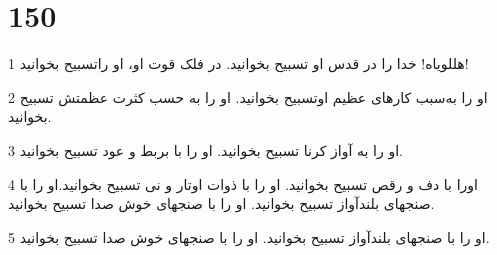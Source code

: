 \chapter{150}

\par 1 هللویاه! خدا را در قدس او تسبیح بخوانید. در فلک قوت او، او راتسبیح بخوانید!
\par 2 او را به‌سبب کارهای عظیم اوتسبیح بخوانید. او را به حسب کثرت عظمتش تسبیح بخوانید.
\par 3 او را به آواز کرنا تسبیح بخوانید. او را با بربط و عود تسبیح بخوانید.
\par 4 اورا با دف و رقص تسبیح بخوانید. او را با ذوات اوتار و نی تسبیح بخوانید.او را با صنجهای بلندآواز تسبیح بخوانید. او را با صنجهای خوش صدا تسبیح بخوانید.
\par 5 او را با صنجهای بلندآواز تسبیح بخوانید. او را با صنجهای خوش صدا تسبیح بخوانید.


